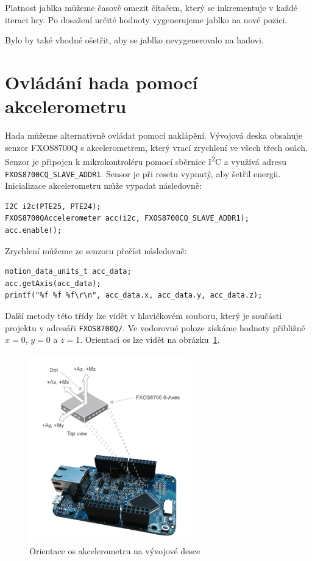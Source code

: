 \documentclass[12pt]{article}
\newcommand{\twi}{I\textsuperscript{2}C}
\begin{document}
Platnost jablka můžeme časově omezit čítačem, který se inkrementuje v každé iteraci hry.
Po dosažení určité hodnoty vygenerujeme jablko na nové pozici.

Bylo by také vhodné ošetřit, aby se jablko nevygenerovalo na hadovi.

\section{Ovládání hada pomocí akcelerometru}
Hada můžeme alternativně ovládat pomocí naklápění.
Vývojová deska obsahuje senzor FXOS8700Q s akcelerometrem, který vrací zrychlení ve všech třech osách.
Senzor je připojen k mikrokontroléru pomocí sběrnice \twi{} a využívá adresu \texttt{FXOS8700CQ\_SLAVE\_ADDR1}.
Sensor je při resetu vypnutý, aby šetřil energii.
Inicializace akcelerometru může vypadat následovně:
\begin{verbatim}
I2C i2c(PTE25, PTE24);
FXOS8700QAccelerometer acc(i2c, FXOS8700CQ_SLAVE_ADDR1);
acc.enable();
\end{verbatim}

Zrychlení můžeme ze senzoru přečíst následovně:
\begin{verbatim}
motion_data_units_t acc_data;
acc.getAxis(acc_data);
printf("%f %f %f\r\n", acc_data.x, acc_data.y, acc_data.z);
\end{verbatim}
Další metody této třídy lze vidět v hlavičkovém souboru, který je součásti projektu v adresáři \texttt{FXOS8700Q/}.
Ve vodorovné poloze získáme hodnoty přibližně $ x = 0$, $y = 0$ a $z = 1 $.
Orientaci os lze vidět na obrázku~\ref{fig:axes}.

\begin{figure}[ht]
  \centering
  \includegraphics[width=7cm]{figures/axis}
  \caption[]{Orientace os akcelerometru na vývojové desce\footnotemark}
  \label{fig:axes}
\end{figure}
\end{document}
